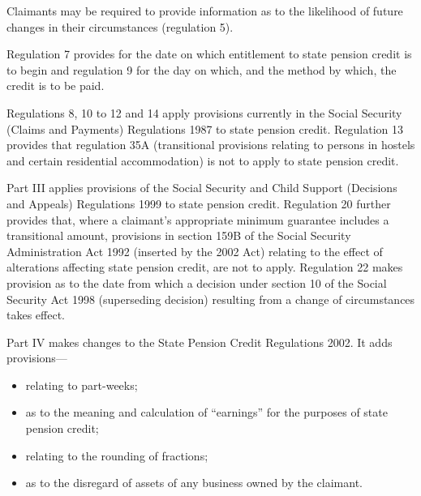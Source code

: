\documentclass[12pt,a4paper]{article}
\begin{document}
Claimants may be required to provide information as to the likelihood of future changes in their circumstances (regulation 5).

Regulation 7 provides for the date on which entitlement to state pension credit is to begin and regulation 9 for the day on which, and the method by which, the credit is to be paid.

Regulations 8, 10 to 12 and 14 apply provisions currently in the Social Security (Claims and Payments) Regulations 1987 to state pension credit. Regulation 13 provides that regulation 35A (transitional provisions relating to persons in hostels and certain residential accommodation) is not to apply to state pension credit.

Part III applies provisions of the Social Security and Child Support (Decisions and Appeals) Regulations 1999 to state pension credit. Regulation 20 further provides that, where a claimant’s appropriate minimum guarantee includes a transitional amount, provisions in section 159B of the Social Security Administration Act 1992 (inserted by the 2002 Act) relating to the effect of alterations affecting state pension credit, are not to apply. Regulation 22 makes provision as to the date from which a decision under section 10 of the Social Security Act 1998 (superseding decision) resulting from a change of circumstances takes effect.

Part IV makes changes to the State Pension Credit Regulations 2002. It adds provisions—
\begin{itemize}\item
    relating to part-weeks;
\item
    as to the meaning and calculation of “earnings” for the purposes of state pension credit;
\item
    relating to the rounding of fractions;
\item
    as to the disregard of assets of any business owned by the claimant. 
\end{itemize}
\end{document}
